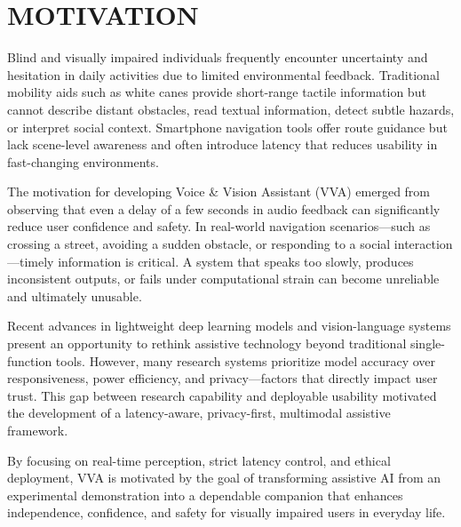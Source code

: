 \section{MOTIVATION}

Blind and visually impaired individuals frequently encounter uncertainty and hesitation in daily activities due to limited environmental feedback. Traditional mobility aids such as white canes provide short-range tactile information but cannot describe distant obstacles, read textual information, detect subtle hazards, or interpret social context. Smartphone navigation tools offer route guidance but lack scene-level awareness and often introduce latency that reduces usability in fast-changing environments.

The motivation for developing Voice \& Vision Assistant (VVA) emerged from observing that even a delay of a few seconds in audio feedback can significantly reduce user confidence and safety. In real-world navigation scenarios—such as crossing a street, avoiding a sudden obstacle, or responding to a social interaction—timely information is critical. A system that speaks too slowly, produces inconsistent outputs, or fails under computational strain can become unreliable and ultimately unusable.

Recent advances in lightweight deep learning models and vision-language systems present an opportunity to rethink assistive technology beyond traditional single-function tools. However, many research systems prioritize model accuracy over responsiveness, power efficiency, and privacy—factors that directly impact user trust. This gap between research capability and deployable usability motivated the development of a latency-aware, privacy-first, multimodal assistive framework.

By focusing on real-time perception, strict latency control, and ethical deployment, VVA is motivated by the goal of transforming assistive AI from an experimental demonstration into a dependable companion that enhances independence, confidence, and safety for visually impaired users in everyday life.


